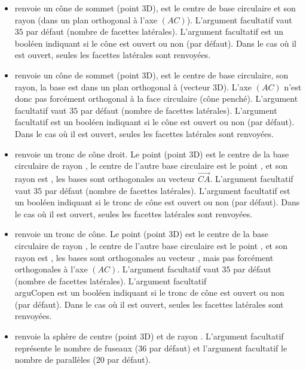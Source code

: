 \begin{itemize}
    \item {} renvoie un cône de sommet  (point 3D),  est le centre de base circulaire et  son rayon (dans un plan orthogonal à l'axe $(AC)$). L'argument facultatif  vaut $35$ par défaut (nombre de facettes latérales). L'argument facultatif  est un booléen indiquant si le cône est ouvert ou non (\false par défaut). Dans le cas où il est ouvert, seules les facettes latérales sont renvoyées.    
    
    \item {} renvoie un cône de sommet  (point 3D),  est le centre de base circulaire,  son rayon, la base est dans un plan orthogonal à  (vecteur 3D). L'axe $(AC)$ n'est donc pas forcément orthogonal à la face circulaire (cône penché). L'argument facultatif  vaut $35$ par défaut (nombre de facettes latérales). L'argument facultatif  est un booléen indiquant si le cône est ouvert ou non (\false par défaut). Dans le cas où il est ouvert, seules les facettes latérales sont renvoyées.        

    \item {} renvoie un tronc de cône droit. Le point  (point 3D) est le centre de la base circulaire de rayon , le centre de l'autre base circulaire est le point , et son rayon est , les bases sont orthogonales au vecteur $\vec{CA}$. L'argument facultatif  vaut $35$ par défaut (nombre de facettes latérales). L'argument facultatif  est un booléen indiquant si le tronc de cône est ouvert ou non (\false par défaut). Dans le cas où il est ouvert, seules les facettes latérales sont renvoyées.    
    
    \item {} renvoie un tronc de cône. Le point  (point 3D) est le centre de la base circulaire de rayon , le centre de l'autre base circulaire est le point , et son rayon est , les bases sont orthogonales au vecteur , mais pas forcément orthogonales à l'axe $(AC)$. L'argument facultatif  vaut $35$ par défaut (nombre de facettes latérales). L'argument facultatif \\argu{C}{open} est un booléen indiquant si le tronc de cône est ouvert ou non (\false par défaut). Dans le cas où il est ouvert, seules les facettes latérales sont renvoyées.

    \item {} renvoie la sphère de centre  (point 3D) et de rayon . L'argument facultatif  représente le nombre de fuseaux ($36$ par défaut) et l'argument facultatif  le nombre de parallèles ($20$ par défaut).
\end{itemize}

